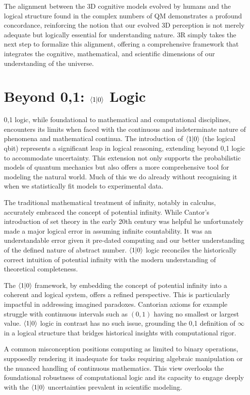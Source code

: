 \documentclass[12pt]{article}
\begin{document}
The alignment between the 3D cognitive models evolved by humans and the logical structure found in the complex numbers of QM demonstrates a profound concordance, reinforcing the notion that our evolved 3D perception is not merely adequate but logically essential for understanding nature. 3R simply takes the next step to formalize this alignment, offering a comprehensive framework that integrates the cognitive, mathematical, and scientific dimensions of our understanding of the universe.

\section*{Beyond {0,1}: \(\langle 1 | 0 \rangle\) Logic}
 {0,1} logic, while foundational to mathematical and computational disciplines, encounters its limits when faced with the continuous and indeterminate nature of phenomena and mathematical continua. The introduction of \(\langle 1 | 0 \rangle\) (the logical qbit) represents a significant leap in logical reasoning, extending beyond {0,1} logic to accommodate uncertainty. This extension not only supports the probabilistic models of quantum mechanics but also offers a more comprehensive tool for modeling the natural world. Much of this we do already without recognising it when we statistically fit models to experimental data.

The traditional mathematical treatment of infinity, notably in calculus, accurately embraced the concept of potential infinity. While Cantor's introduction of set theory in the early 20th century was helpful he unfortunately made a major logical error in assuming infinite countability. It was an understandable error given it pre-dated computing and our better understanding of the defined nature of abstract number. \(\langle 1 | 0 \rangle\) logic reconciles the historically correct intuition of potential infinity with the modern understanding of theoretical completeness.

The \(\langle 1 | 0 \rangle\) framework, by embedding the concept of potential infinity into a coherent and logical system, offers a refined perspective. This is particularly impactful in addressing imagined paradoxes. Cantorian axioms for example struggle with continuous intervals such as \((0,1)\) having no smallest or largest value. \(\langle 1 | 0 \rangle\) logic in contrast has no such issue, grounding the {0,1} definition of \(\infty\) in a logical structure that bridges historical insights with computational rigor.

A common misconception positions computing as limited to binary operations, supposedly rendering it inadequate for tasks requiring algebraic manipulation or the nuanced handling of continuous mathematics. This view overlooks the foundational robustness of computational logic and its capacity to engage deeply with the \(\langle 1 | 0 \rangle\) uncertainties prevalent in scientific modeling.
\end{document}
